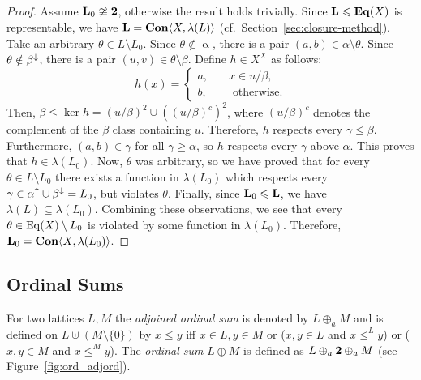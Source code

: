 \begin{proof}
  Assume $\mathbf{L}_0 \ncong \mathbf{2}$, otherwise the result holds trivially. 
  Since $\mathbf{L}\leqslant \mathbf{Eq}(X)$ is representable, we have $\mathbf{L} = \mathbf{Con}
  \langle X, \lambda(L)\rangle$ (cf.~Section~\ref{sec:closure-method}).  Take an arbitrary
  $\theta \in L \setminus L_0$. Since $\theta \notin \upalpha$, 
  there is a pair 
  $(a,b) \in \alpha \setminus \theta$.  Since $\theta \notin \beta^{\downarrow}$, there is
  a pair $(u,v)\in \theta\setminus \beta$. Define $h\in X^X$ as follows:
  \begin{equation}
    \label{eq:h}
    h(x) = \begin{cases}
      a,& \quad x\in u/\beta,\\
      b,& \quad \text{ otherwise.}
    \end{cases}
  \end{equation}
  Then, $\beta \leq \ker h = (u/\beta)^2 \cup ((u/\beta)^c)^2$, where $(u/\beta)^c$ denotes the
  complement of the $\beta$ class containing $u$.  Therefore, $h$ respects every
  $\gamma \leq \beta$.  Furthermore, $(a, b) \in \gamma$ for all $\gamma \geq \alpha$,
  so $h$ respects every $\gamma$ above $\alpha$.  This proves that $h\in \lambda(L_0)$.
  Now, $\theta$ was arbitrary, so we have proved that for every $\theta \in L
  \setminus L_0$ there exists a function in $\lambda(L_0)$ which respects every
  $\gamma \in \alpha^{\uparrow}\cup \beta^{\downarrow} = L_0$, but violates $\theta$.  Finally,
  since 
  $\mathbf{L}_0 \leqslant \mathbf{L}$, we have $\lambda(L)\subseteq \lambda(L_0)$.  Combining these
  observations, we see that every $\theta \in \operatorname{Eq}(X) \setminus L_0$ is
  violated by some function in $\lambda(L_0)$. Therefore, $\mathbf{L}_0 = \mathbf{Con} \langle X, \lambda(L_0)\rangle$.
\end{proof}

\subsection{Ordinal Sums}
\label{sec:ordinal-sums}
For two lattices $L,M$ the \emph{adjoined ordinal sum}  
is denoted by $L\oplus_a M$ and is defined on $L\uplus (M\setminus\{0\})$
by $x\le y$ iff $x\in L,y\in M$ or ($x,y\in L$ and $x\le^L y$) or ($x,y\in M$
and $x\le^M y$). The \emph{ordinal sum} $L\oplus M$ is defined as $L\oplus_a\mathbf{2}\oplus_a M$ (see Figure~\ref{fig:ord_adjord}).

